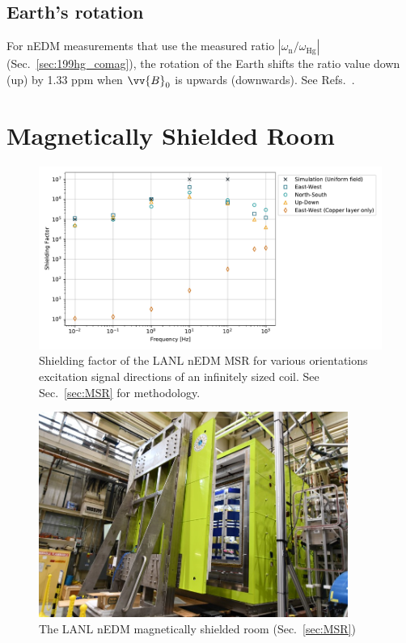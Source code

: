 \subsection*{Earth's rotation}

For nEDM measurements that use the measured ratio $|\omega_\text{n}/\omega_\text{Hg}|$ (Sec.~\ref{sec:199hg_comag}), the rotation of the Earth shifts the ratio value down (up) by 1.33 ppm when $\vv{B}_0$ is upwards (downwards). See Refs.~\cite{lamoreaux_earth_rotation_comment, baker_reply_to_lamoreaux, pendlebury_revised_2015}.


\section
{
    \texorpdfstring{Magnetically Shielded Room}
                    {Magnetically Shielded Room}\label{sec:MSR}
}


\begin{figure}
    \centering
    \includegraphics[width=\textwidth]{figures/chupp_msr_data.pdf}
    \caption
    {Shielding factor of the LANL nEDM MSR for various orientations excitation signal directions of an infinitely sized coil. See Sec.~\ref{sec:MSR} for methodology.}
    \label{fig:MSR-shielding-factor}
\end{figure}

\begin{figure}
    \centering
    \includegraphics[width=0.9\textwidth]{figures/completed_msr.jpg}
    \caption
    {The LANL nEDM magnetically shielded room (Sec.~\ref{sec:MSR})}
    \label{fig:MSR}
\end{figure}

